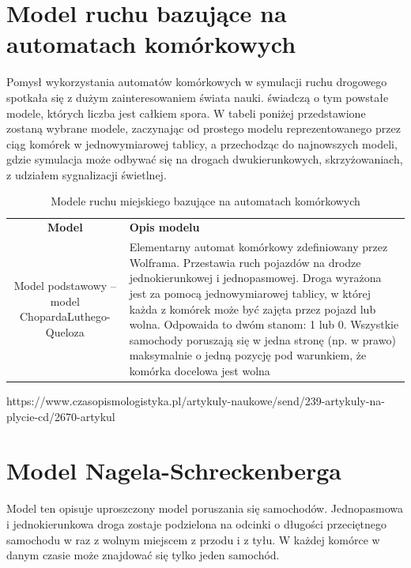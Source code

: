 \documentclass{sprawozdanie-agh}
\begin{document}
	\section{Model ruchu bazujące na automatach komórkowych}

	Pomysł wykorzystania automatów komórkowych w symulacji ruchu drogowego spotkała się z dużym zainteresowaniem świata nauki. świadczą o tym powstałe modele, których liczba jest całkiem spora. W tabeli poniżej przedstawione zostaną wybrane modele, zaczynając od prostego modelu reprezentowanego przez ciąg komórek w jednowymiarowej tablicy, a przechodząc do najnowszych modeli, gdzie symulacja może odbywać się na drogach dwukierunkowych, skrzyżowaniach, z udziałem sygnalizacji świetlnej. \\

	\begin{table}[h]
		\centering
		\begin{tabular}{c|l}
			\textbf{Model} & \textbf{Opis modelu} \\
			Model podstawowy – model ChopardaLuthego-Queloza & Elementarny automat komórkowy zdefiniowany przez Wolframa. Przestawia ruch pojazdów na drodze jednokierunkowej i jednopasmowej. Droga wyrażona jest za pomocą jednowymiarowej tablicy, w której każda z komórek może być zajęta przez pojazd lub wolna. Odpowaida to dwóm stanom: 1 lub 0. Wszystkie samochody poruszają się w jedna stronę (np. w prawo) maksymalnie o jedną pozycję pod warunkiem, że komórka docelowa jest wolna\\
		\end{tabular}
		\caption{Modele ruchu miejskiego bazujące na automatach komórkowych}
		\label{tab:my_label}
	\end{table}





	https://www.czasopismologistyka.pl/artykuly-naukowe/send/239-artykuly-na-plycie-cd/2670-artykul









	\section{Model Nagela-Schreckenberga}

	Model ten opisuje uproszczony model poruszania się samochodów. Jednopasmowa i jednokierunkowa droga zostaje podzielona na odcinki o długości przeciętnego samochodu w raz z wolnym miejscem z przodu i z tyłu. W każdej komórce w danym czasie może znajdować się tylko jeden samochód.
\end{document}
